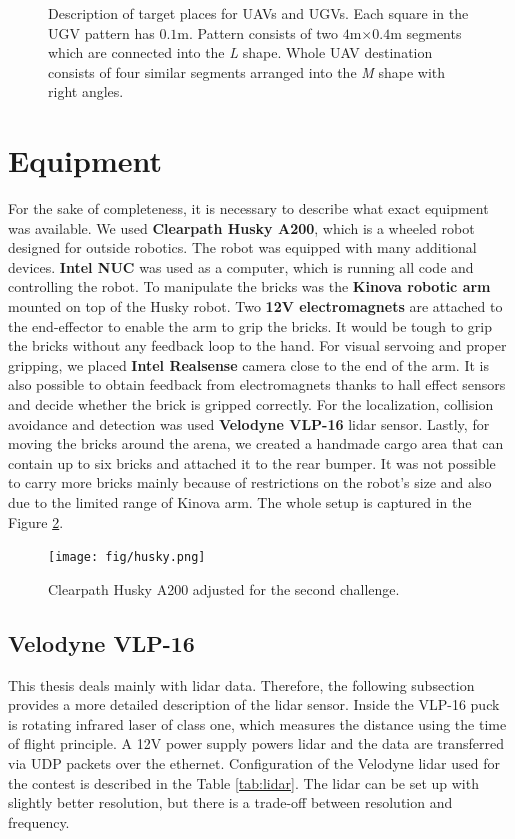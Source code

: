 \begin{figure}[H]
\caption[Brick destinations]{Description of target places for UAVs and UGVs. Each square in the UGV pattern has $0.1$m. Pattern consists of two $4$m$\times0.4$m segments which are connected into the \textit{L} shape. Whole UAV destination consists of four similar segments arranged into the \textit{M} shape with right angles.}
\label{fig:dest}
\end{figure}


\section{Equipment}
For the sake of completeness, it is necessary to describe what exact equipment was available. We used \textbf{Clearpath Husky A200}, which is a wheeled robot designed for outside robotics. The robot was equipped with many additional devices. \textbf{Intel NUC} was used as a computer, which is running all code and controlling the robot. To manipulate the bricks was the \textbf{Kinova robotic arm} mounted on top of the Husky robot. Two \textbf{12V electromagnets} are attached to the end-effector to enable the arm to grip the bricks. It would be tough to grip the bricks without any feedback loop to the hand. For visual servoing and proper gripping, we placed \textbf{Intel Realsense} camera close to the end of the arm. It is also possible to obtain feedback from electromagnets thanks to hall effect sensors and decide whether the brick is gripped correctly. For the localization, collision avoidance and detection was used \textbf{Velodyne VLP-16} lidar sensor. Lastly, for moving the bricks around the arena, we created a handmade cargo area that can contain up to six bricks and attached it to the rear bumper. It was not possible to carry more bricks mainly because of restrictions on the robot's size and also due to the limited range of Kinova arm. The whole setup is captured in the Figure \ref{fig:husky}.

\begin{figure}[H]
\centering
\texttt{[image: fig/husky.png]}
\caption[UGV robot setup]{Clearpath Husky A200 adjusted for the second challenge.}
\label{fig:husky}

\end{figure}

\subsection{Velodyne VLP-16}
This thesis deals mainly with lidar data. Therefore, the following subsection provides a more detailed description of the lidar sensor. Inside the VLP-16 puck is rotating infrared laser of class one, which measures the distance using the time of flight principle. A 12V power supply powers lidar and the data are transferred via UDP packets over the ethernet. Configuration of the Velodyne lidar used for the contest is described in the Table \ref{tab:lidar}. The lidar can be set up with slightly better resolution, but there is a trade-off between resolution and frequency.

